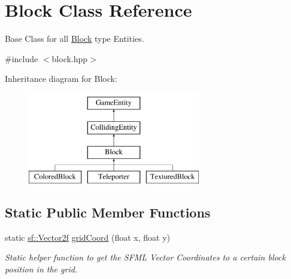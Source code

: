 \hypertarget{class_block}{}\section{Block Class Reference}
\label{class_block}


Base Class for all \mbox{\hyperlink{class_block}{Block}} type Entities.  




{\ttfamily \#include $<$block.\+hpp$>$}

Inheritance diagram for Block\+:\begin{figure}[H]
\begin{center}
\leavevmode
\includegraphics[height=4.000000cm]{class_block}
\end{center}
\end{figure}
\subsection*{Static Public Member Functions}
\begin{DoxyCompactItemize}
\item 
static \mbox{\hyperlink{classsf_1_1_vector2}{sf\+::\+Vector2f}} \mbox{\hyperlink{class_block_ab69c893e453e6fadaf5d50919f07e83f}{grid\+Coord}} (float x, float y)
\begin{DoxyCompactList}\small\item\em Static helper function to get the S\+F\+ML Vector Coordinates to a certain block position in the grid. \end{DoxyCompactList}\end{DoxyCompactItemize}
